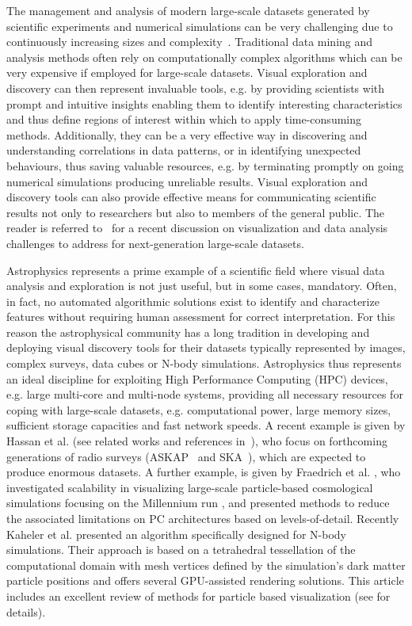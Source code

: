 \documentclass[1p]{elsarticle}
\begin{document}
The management and analysis of modern large-scale datasets generated by scientific experiments and numerical simulations can be very challenging due to continuously increasing sizes and complexity~\cite{DataTsunami}. Traditional data mining and analysis methods often rely on computationally complex
algorithms which can be very expensive if employed for 
large-scale datasets. Visual exploration and discovery can then represent invaluable tools, e.g. by providing scientists with prompt and intuitive insights enabling them to identify interesting characteristics and thus define regions of interest within which
to apply time-consuming methods. Additionally, they can be a very effective way in discovering and understanding correlations in data patterns, or in identifying unexpected behaviours, thus saving valuable resources, e.g. by terminating promptly on going numerical simulations producing unreliable results. Visual exploration and discovery tools can also provide effective means for communicating scientific results not only to researchers but also to members of the general public. The reader is referred to~\cite{DataAnalysisVisualization} for a recent discussion on visualization and data analysis challenges to address for next-generation large-scale datasets.

Astrophysics represents a prime example of a scientific field where visual data analysis and exploration is not just useful, but in some cases, mandatory. Often, in fact, no automated algorithmic solutions exist to identify and characterize features without requiring human assessment for correct interpretation. For this reason the astrophysical community has a long tradition in developing and deploying visual discovery tools for their datasets typically represented by images, complex surveys, data cubes or N-body simulations. Astrophysics thus represents an ideal discipline for exploiting High Performance Computing (HPC) devices, e.g. large multi-core and multi-node systems, providing all necessary resources for coping with large-scale datasets, e.g. computational power, large memory sizes, sufficient storage capacities and fast network speeds. A recent example is given by Hassan et al. (see related works and references in~\cite{2012ASPC..461...45H}), who focus on forthcoming generations of radio surveys (ASKAP~\cite{askap} and SKA~\cite{ska}), which are expected to produce enormous datasets. A further example, is given by Fraedrich et al. \cite{Fraedrich:2009:TMV}, who
investigated scalability in visualizing large-scale particle-based cosmological 
simulations focusing on the Millennium run \cite{millennium}, and presented methods to reduce the associated limitations on PC architectures based on levels-of-detail.
Recently Kaheler et al. \cite{2012arXiv1208.3206K} presented an algorithm specifically designed for N-body simulations. Their approach is based on a tetrahedral tessellation of the computational domain with mesh vertices defined by the simulation's dark matter particle positions and offers several GPU-assisted rendering solutions. This article includes an excellent review of methods for particle based visualization (see \cite{2012arXiv1208.3206K} for details).
\end{document}
